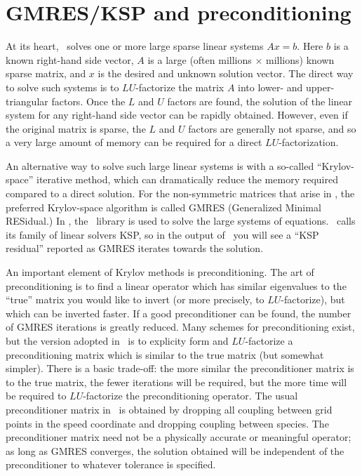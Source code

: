 \section{GMRES/KSP and preconditioning}
\label{sec:gmres}

At its heart, \sfincs~solves one or more large sparse linear systems $Ax=b$.  Here $b$ is a known right-hand side vector,
$A$ is a large (often millions $\times$ millions) known sparse matrix, and $x$ is the desired and unknown solution vector.
The direct way to solve such systems is to $LU$-factorize
the matrix $A$ into lower- and upper-triangular factors.
Once the $L$ and $U$ factors are found, the solution of the linear system
for any right-hand side vector can be rapidly obtained.  However, even if the original matrix is sparse, the $L$ and $U$ factors
are generally not sparse, and so a very large amount of memory can be required for a direct $LU$-factorization.

An alternative way to solve
such large linear systems is with a so-called ``Krylov-space'' iterative method, which can dramatically reduce the memory required
compared to a direct solution.  For the non-symmetric matrices that arise in \sfincs, the preferred Krylov-space
algorithm is called GMRES (Generalized Minimal RESidual.)  In \sfincs, the \PETSc~library is used to solve the large systems
of equations. \PETSc~calls its family of linear solvers KSP, so in the output of \sfincs~you will see a ``KSP residual'' reported
as GMRES iterates towards the solution.

An important element of Krylov methods is preconditioning.  The art of preconditioning is to find a linear operator which has similar eigenvalues
to the ``true'' matrix you would like to invert (or more precisely, to $LU$-factorize), but which can be inverted faster.
If a good preconditioner can be found, the number of GMRES iterations is greatly reduced.  Many schemes for preconditioning exist,
but the version adopted in \sfincs~is to explicity form and $LU$-factorize a preconditioning matrix which is similar
to the true matrix (but somewhat simpler).  There is a basic trade-off:
the more similar the preconditioner matrix is to the true matrix, the fewer iterations will be required, but the more time will
be required to $LU$-factorize the preconditioning operator.  The usual preconditioner matrix in \sfincs~is obtained by dropping all coupling
between grid points in the speed coordinate and dropping coupling between species.  The preconditioner matrix need not be a physically
accurate or meaningful operator; as long as GMRES converges, the solution obtained will be independent of the preconditioner to whatever tolerance is specified.

